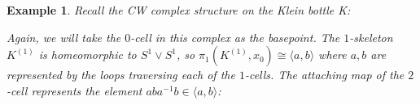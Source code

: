 \documentclass[11pt, letterpaper, oneside]{report}
\theoremstyle{pplain}
\theoremstyle{ddefinition}
\newtheorem{example}[theorem]{Example}
\theoremstyle{nnn}
\theoremstyle{eexercise}
\begin{document}
\begin{example} 
Recall the CW complex structure on the Klein bottle K:


Again, we will take the  $0$-cell in this complex as the basepoint.  
The $1$-skeleton $K^{(1)}$ is homeomorphic to $S^{1}\vee S^{1}$, so 
$\pi_{1}(K^{(1)}, x_{0}) \cong \langle a, b \rangle$ where $a, b$ are represented by the loops 
traversing each of the $1$-cells. The attaching map of the $2$-cell represents the element 
$aba^{-1}b\in \langle a, b \rangle$:


\end{example}
\end{document}
